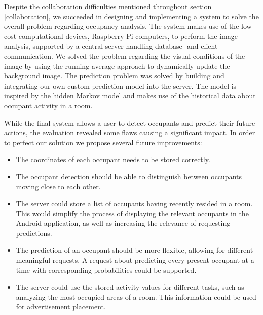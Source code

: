 Despite the collaboration difficulties mentioned throughout section \ref{collaboration}, we succeeded in designing and implementing a system to solve the overall problem regarding occupancy analysis. The system makes use of the low cost computational devices, Raspberry Pi computers, to perform the image analysis, supported by a central server handling database- and client communication. We solved the problem regarding the visual conditions of the image by using the running average approach to dynamically update the background image. The prediction problem was solved by building and integrating our own custom prediction model into the server. The model is inspired by the hidden Markov model and makes use of the historical data about occupant activity in a room.

While the final system allows a user to detect occupants and predict their future actions, the evaluation revealed some flaws causing a significant impact. In order to perfect our solution we propose several future improvements: 
\begin{itemize}
\item The coordinates of each occupant needs to be stored correctly.
\item The occupant detection should be able to distinguish between occupants moving close to each other.
\item The server could store a list of occupants having recently resided in a room. This would simplify the process of displaying the relevant occupants in the Android application, as well as increasing the relevance of requesting predictions.
\item The prediction of an occupant should be more flexible, allowing for different meaningful requests. A request about predicting every present occupant at a time with corresponding probabilities could be supported. 
\item The server could use the stored activity values for different tasks, such as analyzing the most occupied areas of a room. This information could be used for advertisement placement.
\end{itemize}